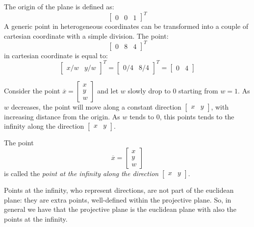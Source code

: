 \documentclass[12pt, a4paper]{report}
\newtheorem[style=M,bodystyle=\normalfont]{theorem}{Theorem}
\newtheorem[style=M,bodystyle=\normalfont]{corollary}{Corollary}
\newtheorem[style=M,bodystyle=\normalfont]{lemma}{Lemma}
\newtheorem[style=M,bodystyle=\normalfont]{definition}{Definition}
\begin{document}
    \begin{example}
        The origin of the plane is defined as:
        \[{\begin{bmatrix} 0 & 0 & 1 \end{bmatrix}}^T\]
        A generic point in heterogeneous coordinates can be transformed into a couple of cartesian coordinate with a simple division. The point:
        \[{\begin{bmatrix} 0 & 8 & 4 \end{bmatrix}}^T\]
        in cartesian coordinate is equal to: 
        \[{\begin{bmatrix} x/w & y/w  \end{bmatrix}}^T={\begin{bmatrix} 0/4 & 8/4 \end{bmatrix}}^T=\begin{bmatrix} 0 & 4 \end{bmatrix}\]
    \end{example}
    Consider the point $\overline{x}=\begin{bmatrix} x \\ y \\ w \end{bmatrix}$ and let $w$ slowly drop to $0$ starting from $w=1$. As $w$ decreases, the point will move along a 
    constant direction $\begin{bmatrix} x & y \end{bmatrix}$, with increasing distance from the origin. As $w$ tends to $0$, this points tends to the infinity along the direction 
    $\begin{bmatrix} x & y \end{bmatrix}$. 
    \begin{definition}
        The point \[\overline{x} = \begin{bmatrix} x \\ y \\ w \end{bmatrix}\] is called the \emph{point at the infinity along the direction} $\begin{bmatrix} x & y \end{bmatrix}$. 
    \end{definition}
    Points at the infinity, who represent directions, are not part of the euclidean plane: they are extra points, well-defined within the projective plane. So, in general we have
    that the projective plane is the euclidean plane with also the points at the infinity. 
\end{document}
